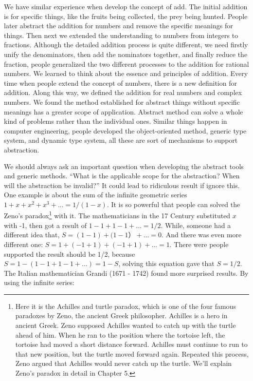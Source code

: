 \documentclass{article}
\begin{document}
We have similar experience when develop the concept of add. The initial addition is for specific things, like the fruits being collected, the prey being hunted. People later abstract the addition for numbers and remove the specific meanings for things. Then next we extended the understanding to numbers from integers to fractions. Although the detailed addition process is quite different, we need firstly unify the denominators, then add the nominators together, and finally reduce the fraction, people generalized the two different processes to the addition for rational numbers. We learned to think about the essence and principles of addition. Every time when people extend the concept of numbers, there is a new definition for addition. Along this way, we defined the addition for real numbers and complex numbers. We found the method established for abstract things without specific meanings has a greater scope of application. Abstract method can solve a whole kind of problems rather than the individual ones. Similar things happen in computer engineering, people developed the object-oriented method, generic type system, and dynamic type system, all these are sort of mechanisms to support abstraction.

We should always ask an important question when developing the abstract tools and generic methods. ``What is the applicable scope for the abstraction? When will the abstraction be invalid?'' It could lead to ridiculous result if ignore this. One example is about the sum of the infinite geometric series $1 + x + x^2 + x^3 + ... = 1/(1-x)$. It is so powerful that people can solved the Zeno's paradox\footnote{Here it is the Achilles and turtle paradox, which is one of the four famous paradoxes by Zeno, the ancient Greek philosopher. Achilles is a hero in ancient Greek. Zeno supposed Achilles wanted to catch up with the turtle ahead of him. When he ran to the position where the tortoise left, the tortoise had moved a short distance forward. Achilles must continue to run to that new position, but the turtle moved forward again. Repeated this process, Zeno argued that Achilles would never catch up the turtle. We'll explain Zeno's paradox in detail in Chapter 5.} with it. The mathematicians in the 17 Century substituted $x$ with -1, then got a result of $1 - 1 + 1 - 1 + ... = 1/2$. While, someone had a different idea that, $S = (1 - 1) + (1 - 1）+ ... = 0$. And there was even more different one: $S = 1 + (-1 + 1) + (-1 + 1) + ... = 1$. There were people supported the result should be 1/2, because $S = 1 - (1 - 1 + 1 - 1 + ...) = 1 -S$, solving this equation gave that $S = 1/2$. The Italian mathematician Grandi (1671 - 1742) found more surprised results. By using the infinite series:
\end{document}
